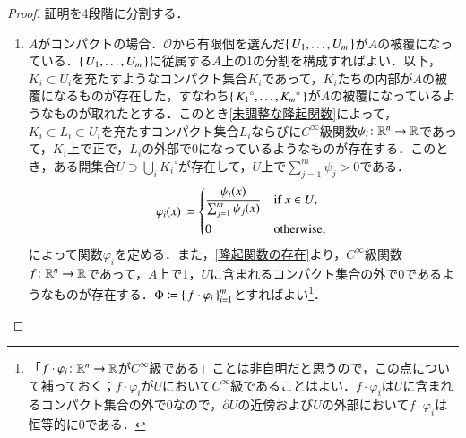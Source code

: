 \begin{proof}
証明を4段階に分割する．
\begin{enumerate}
\item $A$がコンパクトの場合．$\mathscr{O}$から有限個を選んだ$\set{U_1, \dots, U_m}$が$A$の被覆になっている．$\set{U_1 ,\dots, U_m}$に従属する$A$上の1の分割を構成すればよい．以下，$K_i \subset U_i$を充たすようなコンパクト集合$K_i$であって，$K_i$たちの内部が$A$の被覆になるものが存在した，すなわち$\set{{K_1}^\circ,\dots, {K_m}^\circ}$が$A$の被覆になっているようなものが取れたとする．このとき\cref{未調整な隆起関数}によって，$K_i \subset L_i \subset U_i$を充たすコンパクト集合$L_i$ならびに$C^\infty$級関数$\psi_i \colon \mathbb{R}^n \to \mathbb{R}$であって，$K_i$上で正で，$L_i$の外部で0になっているようなものが存在する．このとき，ある開集合$U \supset \bigcup_i {K_i}^\circ$が存在して，$U$上で$\sum_{j=1}^m \psi_j > 0$である．
\begin{equation}\varphi_i(x) \coloneqq 
 \begin{dcases*}
    \frac{\psi_i(x)}{\sum_{j=1}^m \psi_j(x)} & if $x \in U$, \\
    0 & otherwise,
  \end{dcases*}
\end{equation}によって関数$\varphi_i$を定める．また，\cref{隆起関数の存在}より，$C^\infty$級関数$f \colon \mathbb{R}^n \to \mathbb{R}$であって，$A$上で1，$U$に含まれるコンパクト集合の外で0であるようなものが存在する．$\Phi \coloneqq \set{f \cdot \varphi_i}_{i=1}^m$とすればよい\footnote{「$f \cdot \varphi_i \colon \mathbb{R}^n \to \mathbb{R}$が$C^\infty$級である」ことは非自明だと思うので，この点について補っておく；$f \cdot \varphi_i$が$U$において$C^\infty$級であることはよい．$f \cdot \varphi_i$は$U$に含まれるコンパクト集合の外で0なので，$\partial U$の近傍および$U$の外部において$f \cdot \varphi_i$は恒等的に0である．}．


\end{enumerate}
\end{proof}

